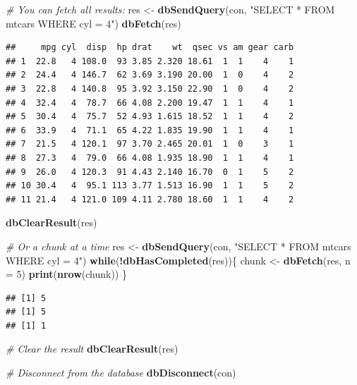 \documentclass[]{book}
\newenvironment{Shaded}{\begin{snugshade}}{\end{snugshade}}
\newcommand{\CommentTok}[1]{\textcolor[rgb]{0.56,0.35,0.01}{\textit{#1}}}
\newcommand{\ControlFlowTok}[1]{\textcolor[rgb]{0.13,0.29,0.53}{\textbf{#1}}}
\newcommand{\DataTypeTok}[1]{\textcolor[rgb]{0.13,0.29,0.53}{#1}}
\newcommand{\DecValTok}[1]{\textcolor[rgb]{0.00,0.00,0.81}{#1}}
\newcommand{\KeywordTok}[1]{\textcolor[rgb]{0.13,0.29,0.53}{\textbf{#1}}}
\newcommand{\NormalTok}[1]{#1}
\newcommand{\OperatorTok}[1]{\textcolor[rgb]{0.81,0.36,0.00}{\textbf{#1}}}
\newcommand{\StringTok}[1]{\textcolor[rgb]{0.31,0.60,0.02}{#1}}
\begin{document}
\begin{Shaded}
\begin{Highlighting}[]
\CommentTok{# You can fetch all results:}
\NormalTok{res <-}\StringTok{ }\KeywordTok{dbSendQuery}\NormalTok{(con, }\StringTok{"SELECT * FROM mtcars WHERE cyl = 4"}\NormalTok{)}
\KeywordTok{dbFetch}\NormalTok{(res)}
\end{Highlighting}
\end{Shaded}

\begin{verbatim}
##     mpg cyl  disp  hp drat    wt  qsec vs am gear carb
## 1  22.8   4 108.0  93 3.85 2.320 18.61  1  1    4    1
## 2  24.4   4 146.7  62 3.69 3.190 20.00  1  0    4    2
## 3  22.8   4 140.8  95 3.92 3.150 22.90  1  0    4    2
## 4  32.4   4  78.7  66 4.08 2.200 19.47  1  1    4    1
## 5  30.4   4  75.7  52 4.93 1.615 18.52  1  1    4    2
## 6  33.9   4  71.1  65 4.22 1.835 19.90  1  1    4    1
## 7  21.5   4 120.1  97 3.70 2.465 20.01  1  0    3    1
## 8  27.3   4  79.0  66 4.08 1.935 18.90  1  1    4    1
## 9  26.0   4 120.3  91 4.43 2.140 16.70  0  1    5    2
## 10 30.4   4  95.1 113 3.77 1.513 16.90  1  1    5    2
## 11 21.4   4 121.0 109 4.11 2.780 18.60  1  1    4    2
\end{verbatim}

\begin{Shaded}
\begin{Highlighting}[]
\KeywordTok{dbClearResult}\NormalTok{(res)}

\CommentTok{# Or a chunk at a time}
\NormalTok{res <-}\StringTok{ }\KeywordTok{dbSendQuery}\NormalTok{(con, }\StringTok{"SELECT * FROM mtcars WHERE cyl = 4"}\NormalTok{)}
\ControlFlowTok{while}\NormalTok{(}\OperatorTok{!}\KeywordTok{dbHasCompleted}\NormalTok{(res))\{}
\NormalTok{  chunk <-}\StringTok{ }\KeywordTok{dbFetch}\NormalTok{(res, }\DataTypeTok{n =} \DecValTok{5}\NormalTok{)}
  \KeywordTok{print}\NormalTok{(}\KeywordTok{nrow}\NormalTok{(chunk))}
\NormalTok{\}}
\end{Highlighting}
\end{Shaded}

\begin{verbatim}
## [1] 5
## [1] 5
## [1] 1
\end{verbatim}

\begin{Shaded}
\begin{Highlighting}[]
\CommentTok{# Clear the result}
\KeywordTok{dbClearResult}\NormalTok{(res)}

\CommentTok{# Disconnect from the database}
\KeywordTok{dbDisconnect}\NormalTok{(con)}
\end{Highlighting}
\end{Shaded}
\end{document}
